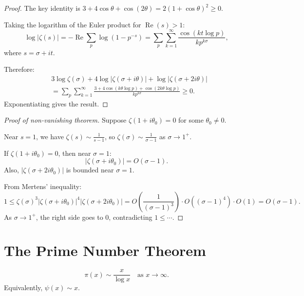 \begin{proof}
  The key identity is $3 + 4\cos\theta + \cos(2\theta) = 2(1 + \cos\theta)^2 \geq 0$.

  Taking the logarithm of the Euler product for $\operatorname{Re}(s) > 1$:
  \begin{equation}
    \log|\zeta(s)| = -\operatorname{Re}\sum_p \log(1 - p^{-s}) = \sum_p \sum_{k=1}^{\infty} \frac{\cos(k t \log p)}{k p^{k\sigma}},
  \end{equation}
  where $s = \sigma + it$.

  Therefore:
  \begin{align}
     & 3\log\zeta(\sigma) + 4\log|\zeta(\sigma + i\theta)| + \log|\zeta(\sigma + 2i\theta)|                       \\
     & = \sum_p \sum_{k=1}^{\infty} \frac{3 + 4\cos(k\theta\log p) + \cos(2k\theta\log p)}{k p^{k\sigma}} \geq 0.
  \end{align}
  Exponentiating gives the result.
\end{proof}

\begin{proof}[Proof of non-vanishing theorem]
  Suppose $\zeta(1 + i\theta_0) = 0$ for some $\theta_0 \neq 0$.

  Near $s = 1$, we have $\zeta(s) \sim \frac{1}{s-1}$, so $\zeta(\sigma) \sim \frac{1}{\sigma - 1}$ as $\sigma \to 1^+$.

  If $\zeta(1 + i\theta_0) = 0$, then near $\sigma = 1$:
  \begin{equation}
    |\zeta(\sigma + i\theta_0)| = O(\sigma - 1).
  \end{equation}
  Also, $|\zeta(\sigma + 2i\theta_0)|$ is bounded near $\sigma = 1$.

  From Mertens' inequality:
  \begin{equation}
    1 \leq \zeta(\sigma)^3 |\zeta(\sigma + i\theta_0)|^4 |\zeta(\sigma + 2i\theta_0)| = O\left(\frac{1}{(\sigma-1)^3}\right) \cdot O((\sigma-1)^4) \cdot O(1) = O(\sigma - 1).
  \end{equation}
  As $\sigma \to 1^+$, the right side goes to $0$, contradicting $1 \leq \cdots$.
\end{proof}

\section{The Prime Number Theorem}

\begin{theorem}
  \begin{equation}
    \pi(x) \sim \frac{x}{\log x} \quad \text{as } x \to \infty.
  \end{equation}
  Equivalently, $\psi(x) \sim x$.
\end{theorem}

